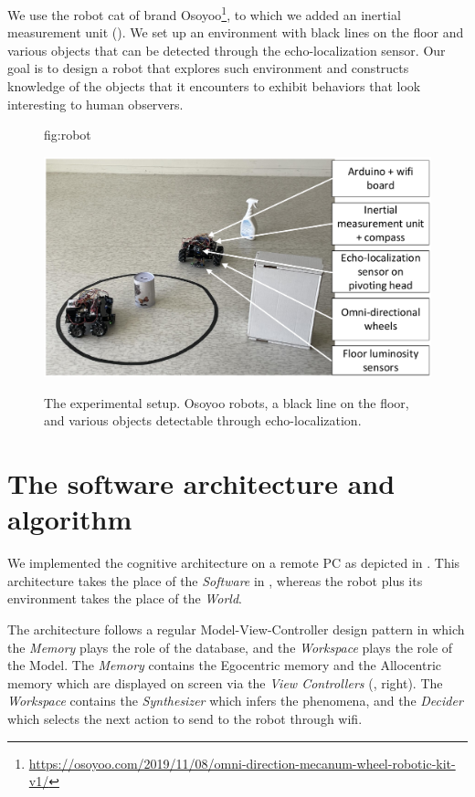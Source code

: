 \documentclass[pmlr]{jmlr}%
\begin{document}
We use the robot cat of brand Osoyoo\footnote{\url{https://osoyoo.com/2019/11/08/omni-direction-mecanum-wheel-robotic-kit-v1/}}, to which we added an inertial measurement unit (). 
We set up an environment with black lines on the floor and various objects that can be detected through the echo-localization sensor. 
Our goal is to design a robot that explores such environment and constructs knowledge of the objects that it encounters to exhibit behaviors that look interesting to human observers. 

\begin{figure}[htbp]
	\floatconts
	{fig:robot}
	{\caption{The experimental setup. Osoyoo robots, a black line on the floor, and various objects detectable through echo-localization.}}
	{\includegraphics[width=0.8\linewidth]{images/Figure_1_Robotb}}
\end{figure}

\section{The software architecture and algorithm}
\label{sec:software}

We implemented the cognitive architecture on a remote PC as depicted in . 
This architecture takes the place of the \textit{Software} in , whereas the robot plus its environment takes the place of the \textit{World}.

The architecture follows a regular Model-View-Controller design pattern in which the \textit{Memory} plays the role of the database, and the \textit{Workspace} plays the role of the Model. 
The \textit{Memory} contains the Egocentric memory and the Allocentric memory which are displayed on screen via the \textit{View Controllers} (, right).
The \textit{Workspace} contains the \textit{Synthesizer} which infers the phenomena, and the \textit{Decider} which selects the next action to send to the robot through wifi. 
\end{document}
